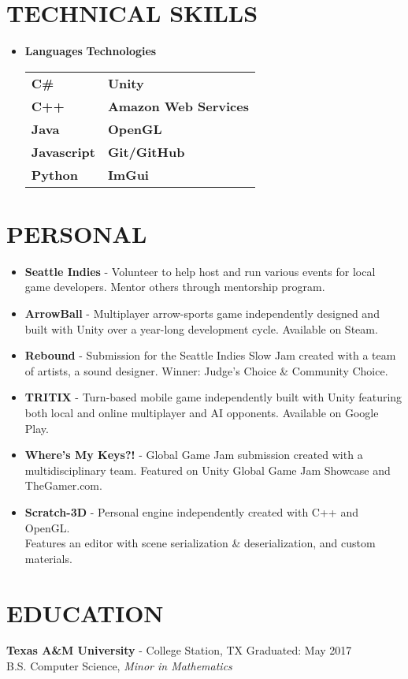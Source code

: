 \documentclass[resmargin,10pt]{res} %
\begin{document}
\begin{resume}
\section{TECHNICAL SKILLS}	
							\begin{itemize}
                    		\item[] 
\textbf{\large Languages}  \hspace*{.5in} \textbf{\large Technologies}        \\
\begin{tabular}{ll}
\textbf{C\#} \hspace*{1in}  & \textbf{Unity} \\
\textbf{C++} & \textbf{Amazon Web Services} \\
\textbf{Java}   & \textbf{OpenGL}       \\
\textbf{Javascript}  & \textbf{Git/GitHub}               \\
\textbf{Python} & \textbf{ImGui}               \\
\end{tabular}
                    		\end{itemize} 
\section{PERSONAL}
				\begin{itemize}
				\item \textbf{Seattle Indies} - Volunteer to help host and run various events for local game developers. Mentor others through mentorship program.
								\item \textbf{ArrowBall} - Multiplayer arrow-sports game independently designed and built with Unity over a year-long development cycle. Available on Steam.
								\item \textbf{Rebound} - Submission for the Seattle Indies Slow Jam created with a team of artists, a sound designer. Winner: Judge's Choice \& Community Choice.   
				                	\item \textbf{TRITIX} - Turn-based mobile game independently built with Unity featuring both local and online multiplayer and AI opponents. Available on Google Play.
				\item \textbf{Where's My Keys?!} - Global Game Jam submission created with a multidisciplinary team. Featured on Unity Global Game Jam Showcase and TheGamer.com.
				                	\item \textbf{Scratch-3D} - Personal engine independently created with C++ and OpenGL. \\Features an editor with scene serialization \& deserialization, and custom materials.
                \end{itemize}
                
\section{EDUCATION}
{\bf Texas A\&M University} - College Station, TX \hfill
Graduated: May 2017 \\
B.S. Computer Science,
\textit{Minor in Mathematics}
\end{resume} 
\end{document}
